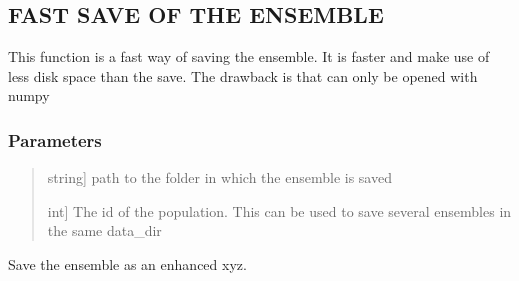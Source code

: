 \documentclass[a4paper,11pt,english]{sphinxmanual}
\begin{document}
\begin{fulllineitems}
\begin{fulllineitems}
\end{fulllineitems}


\begin{fulllineitems}
\label{\detokenize{apireference:sscha.Ensemble.Ensemble.save_bin}}
\pysigstartsignatures
{}
\pysigstopsignatures

\subsection{FAST SAVE OF THE ENSEMBLE}
\label{\detokenize{apireference:fast-save-of-the-ensemble}}
\sphinxAtStartPar
This function is a fast way of saving the ensemble.
It is faster and make use of less disk space than the save.
The drawback is that can only be opened with numpy


\subsubsection{Parameters}
\label{\detokenize{apireference:id22}}\begin{quote}
\begin{description}
\sphinxlineitem{data\_dir}{[}string{]}
\sphinxAtStartPar
path to the folder in which the ensemble is saved

\sphinxlineitem{population\_id}{[}int{]}
\sphinxAtStartPar
The id of the population. This can be used to save
several ensembles in the same data\_dir

\end{description}
\end{quote}

\end{fulllineitems}


\begin{fulllineitems}
\label{\detokenize{apireference:sscha.Ensemble.Ensemble.save_enhanced_xyz}}
\pysigstartsignatures
{}
\pysigstopsignatures
\sphinxAtStartPar
Save the ensemble as an enhanced xyz.


\end{fulllineitems}
\end{fulllineitems}
\end{document}

